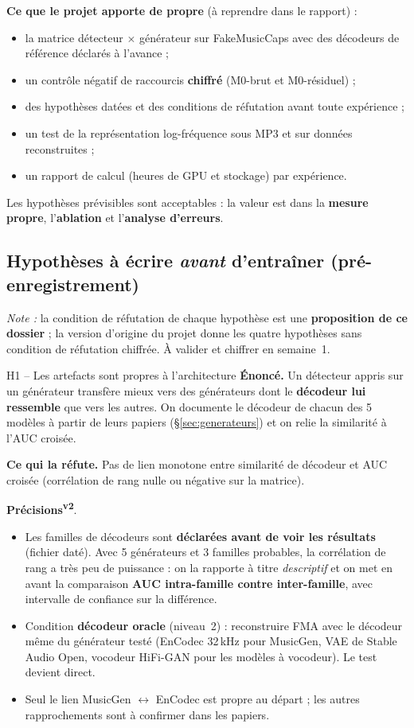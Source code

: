 \documentclass[11pt,a4paper]{article}
\providecommand{\og}{\guillemotleft\nobreakspace}%
\providecommand{\fg}{\nobreakspace\guillemotright}}
\newcommand{\vtwo}{\textsuperscript{\textcolor{orange!80!black}{\textbf{v2}}}}
\begin{document}
\textbf{Ce que le projet apporte de propre} (à reprendre dans le rapport) :
\begin{itemize}
\item la matrice détecteur $\times$ générateur sur FakeMusicCaps avec des décodeurs de référence déclarés à l'avance ;
\item un contrôle négatif de raccourcis \textbf{chiffré} (M0-brut et M0-résiduel) ;
\item des hypothèses datées et des conditions de réfutation avant toute expérience ;
\item un test de la représentation log-fréquence sous MP3 et sur données reconstruites ;
\item un rapport de calcul (heures de GPU et stockage) par expérience.
\end{itemize}
Les hypothèses prévisibles sont acceptables : la valeur est dans la \textbf{mesure propre}, l'\textbf{ablation} et l'\textbf{analyse d'erreurs}.

\subsection{Hypothèses à écrire \emph{avant} d'entraîner (pré-enregistrement)}\label{sec:hyp}

\textit{Note :} la condition de réfutation de chaque hypothèse est une \textbf{proposition de ce dossier} ; la version d'origine du projet donne les quatre hypothèses sans condition de réfutation chiffrée. À valider et chiffrer en semaine~1.

\begin{hyp}{H1 -- Les artefacts sont propres à l'architecture}
\textbf{Énoncé.} Un détecteur appris sur un générateur transfère mieux vers des générateurs dont le \textbf{décodeur lui ressemble} que vers les autres. On documente le décodeur de chacun des 5 modèles à partir de leurs papiers (§\ref{sec:generateurs}) et on relie la similarité à l'AUC croisée.

\textbf{Ce qui la réfute.} Pas de lien monotone entre similarité de décodeur et AUC croisée (corrélation de rang nulle ou négative sur la matrice).

\textbf{Précisions}\vtwo.
\begin{itemize}
\item Les familles de décodeurs sont \textbf{déclarées avant de voir les résultats} (fichier daté). Avec 5 générateurs et 3 familles probables, la corrélation de rang a très peu de puissance : on la rapporte à titre \emph{descriptif} et on met en avant la comparaison \textbf{AUC intra-famille contre inter-famille}, avec intervalle de confiance sur la différence.
\item Condition \og{}\textbf{décodeur oracle}\fg{} (niveau~2) : reconstruire FMA avec le décodeur même du générateur testé (EnCodec 32\,kHz pour MusicGen, VAE de Stable Audio Open, vocodeur HiFi-GAN pour les modèles à vocodeur). Le test devient direct.
\item Seul le lien MusicGen $\leftrightarrow$ EnCodec est propre au départ ; les autres rapprochements sont à confirmer dans les papiers.
\end{itemize}
\end{hyp}
\end{document}
